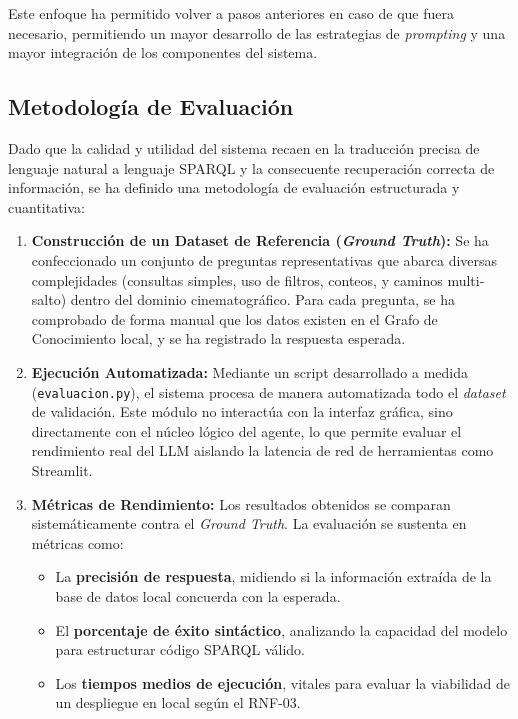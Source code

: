 Este enfoque ha permitido volver a pasos anteriores en caso de que fuera necesario, permitiendo un mayor desarrollo de las estrategias de \textit{prompting} y una mayor integración de los componentes del sistema.

\subsection{Metodología de Evaluación}

Dado que la calidad y utilidad del sistema recaen en la traducción precisa de lenguaje natural a lenguaje SPARQL y la consecuente recuperación correcta de información, se ha definido una metodología de evaluación estructurada y cuantitativa:

\begin{enumerate}
    \item \textbf{Construcción de un Dataset de Referencia (\textit{Ground Truth}):} Se ha confeccionado un conjunto de preguntas representativas que abarca diversas complejidades (consultas simples, uso de filtros, conteos, y caminos multi-salto) dentro del dominio cinematográfico. Para cada pregunta, se ha comprobado de forma manual que los datos existen en el Grafo de Conocimiento local, y se ha registrado la respuesta esperada.
    \item \textbf{Ejecución Automatizada:} Mediante un script desarrollado a medida (\texttt{evaluacion.py}), el sistema procesa de manera automatizada todo el \textit{dataset} de validación. Este módulo no interactúa con la interfaz gráfica, sino directamente con el núcleo lógico del agente, lo que permite evaluar el rendimiento real del LLM aislando la latencia de red de herramientas como Streamlit.
    \item \textbf{Métricas de Rendimiento:} Los resultados obtenidos se comparan sistemáticamente contra el \textit{Ground Truth}. La evaluación se sustenta en métricas como:
    \begin{itemize}
        \item La \textbf{precisión de respuesta}, midiendo si la información extraída de la base de datos local concuerda con la esperada.
        \item El \textbf{porcentaje de éxito sintáctico}, analizando la capacidad del modelo para estructurar código SPARQL válido.
        \item Los \textbf{tiempos medios de ejecución}, vitales para evaluar la viabilidad de un despliegue en local según el RNF-03.
    \end{itemize}
\end{enumerate}

